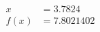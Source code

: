 \documentclass[preview]{standalone}
\begin{document}
\begin{align*}
x &= 3.7824\\f(x) &= 7.8021402
\end{align*}
\end{document}
